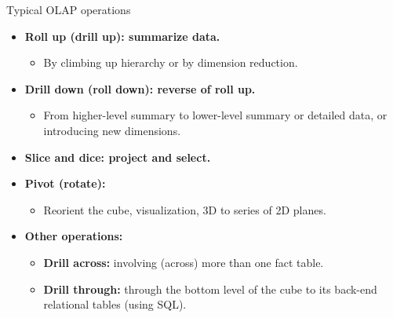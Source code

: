 \documentclass[aspectratio=169,t]{beamer}
\begin{document}
  { 
    \begin{frame}{Typical OLAP operations}
        \begin{itemize}
            \item \textbf{{\color{airforceblue}Roll up} (drill up): summarize data.}
            \begin{itemize}
                \item By climbing up hierarchy or by dimension reduction.
            \end{itemize}
            \item \textbf{{\color{airforceblue}Drill down} (roll down): reverse of roll up.}
            \begin{itemize}
                \item From higher-level summary to lower-level summary or detailed data, or introducing new dimensions.
            \end{itemize}
            \item \textbf{{\color{airforceblue}Slice and dice}: project and select.}
            \item \textbf{{\color{airforceblue}Pivot} (rotate):}
            \begin{itemize}
                \item Reorient the cube, visualization, 3D to series of 2D planes.
            \end{itemize}
            \item \textbf{Other operations:}
            \begin{itemize}
                \item \textbf{{\color{airforceblue}Drill across}:} involving (across) more than one fact table.
                \item \textbf{{\color{airforceblue}Drill through}:} through the bottom level of the cube to its back-end relational tables (using SQL).
            \end{itemize}
        \end{itemize}
    \end{frame}
  }
\end{document}
